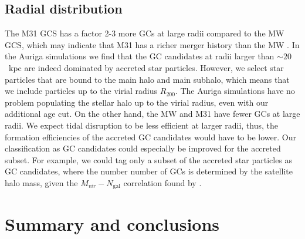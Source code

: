 \documentclass[a4paper,fleqn,usenatbib]{mnras}
\newcommand{\Sun}[0]{\ensuremath{_{\odot}}}
\providecommand{\DIFadd}[1]{{\protect\color{blue}\uwave{#1}}} %
\providecommand{\DIFdel}[1]{{\protect\color{red}\sout{#1}}}                      %
\providecommand{\DIFaddbegin}{} %
\providecommand{\DIFaddend}{} %
\providecommand{\DIFdelbegin}{} %
\providecommand{\DIFdelend}{} %
\newcommand{\DIFscaledelfig}{0.5}
\newlength{\DIFdelgraphicswidth} %
\newlength{\DIFdelgraphicsheight} %
\newcommand{\DIFaddincludegraphics}[2][]{{\color{blue}\fbox{\DIFOincludegraphics[#1]{#2}}}} %
\newcommand{\DIFdelincludegraphics}[2][]{%
\sbox{\DIFdelgraphicsbox}{\DIFOincludegraphics[#1]{#2}}%
\settoboxwidth{\DIFdelgraphicswidth}{\DIFdelgraphicsbox} %
\settoboxtotalheight{\DIFdelgraphicsheight}{\DIFdelgraphicsbox} %
\scalebox{\DIFscaledelfig}{%
\parbox[b]{\DIFdelgraphicswidth}{\usebox{\DIFdelgraphicsbox}\\[-\baselineskip] \rule{\DIFdelgraphicswidth}{0em}}\llap{\resizebox{\DIFdelgraphicswidth}{\DIFdelgraphicsheight}{%
\setlength{\unitlength}{\DIFdelgraphicswidth}%
\begin{picture}(1,1)%
\thicklines\linethickness{2pt} %
{\color[rgb]{1,0,0}\put(0,0){\framebox(1,1){}}}%
{\color[rgb]{1,0,0}\put(0,0){\line( 1,1){1}}}%
{\color[rgb]{1,0,0}\put(0,1){\line(1,-1){1}}}%
\end{picture}%
}\hspace*{3pt}}} %
} %
\DeclareRobustCommand{\DIFaddbegin}{\DIFOaddbegin \let\includegraphics\DIFaddincludegraphics} %
\DeclareRobustCommand{\DIFaddend}{\DIFOaddend \let\includegraphics\DIFOincludegraphics} %
\DeclareRobustCommand{\DIFdelbegin}{\DIFOdelbegin \let\includegraphics\DIFdelincludegraphics} %
\DeclareRobustCommand{\DIFdelend}{\DIFOaddend \let\includegraphics\DIFOincludegraphics} %
\begin{document}
\subsection{Radial distribution}
\label{sec:discussion_Rgc}
The M31 GCS has a factor 2-3 more GCs at large radii compared to the MW GCS,
which may indicate that M31 has a richer merger history than the MW 
\citep{2016ApJ...824...42C}. In the Auriga simulations we find that the GC 
candidates at radii larger than ${\sim}20$~kpc are indeed dominated by accreted
star particles. However, we select star particles that are bound to the main 
halo and main subhalo, which means that we include particles up to the virial 
radius \DIFdelbegin \DIFdel{$R_{200}$}\DIFdelend \DIFaddbegin \DIFadd{$r_{200}$}\DIFaddend . The Auriga simulations have no problem populating the stellar 
halo up to the virial radius, even with our additional age cut. On the other hand, 
the MW and M31 have fewer GCs at large radii. We expect tidal disruption to be
less efficient at larger radii, thus, the formation efficiencies of the accreted 
GC candidates would have to be lower. Our classification as GC candidates could
especially be improved for the accreted subset. For example, we could tag only a
subset of the accreted star particles as GC candidates, where the number
number of GCs is determined by the satellite halo mass, given the 
$M_{vir}-N_{\text{gal}}$ correlation found by \citet{2019arXiv190100900B}.




\section{Summary and conclusions}
\label{sec:conclusions}
\end{document}
